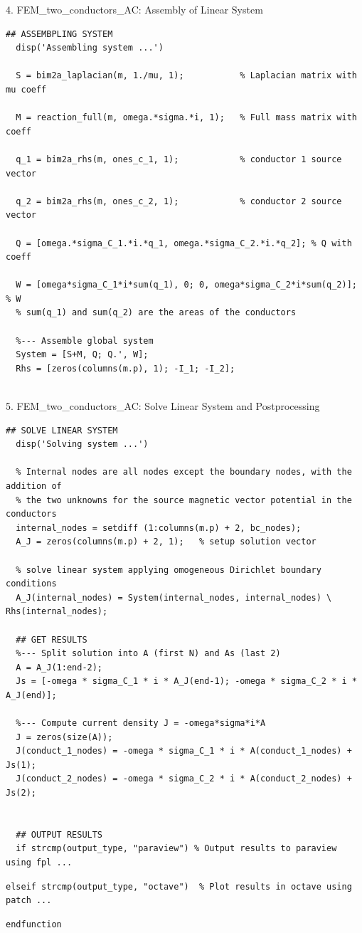 \documentclass[aspectratio=54,xcolor=dvipsnames]{beamer}
\begin{document}
\begin{frame}[fragile]{4. FEM\_two\_conductors\_AC: Assembly of Linear System}
\scriptsize
\begin{lstlisting}[firstnumber=76]
  ## ASSEMBPLING SYSTEM
  disp('Assembling system ...')

  S = bim2a_laplacian(m, 1./mu, 1);           % Laplacian matrix with mu coeff

  M = reaction_full(m, omega.*sigma.*i, 1);   % Full mass matrix with coeff

  q_1 = bim2a_rhs(m, ones_c_1, 1);            % conductor 1 source vector

  q_2 = bim2a_rhs(m, ones_c_2, 1);            % conductor 2 source vector

  Q = [omega.*sigma_C_1.*i.*q_1, omega.*sigma_C_2.*i.*q_2]; % Q with coeff

  W = [omega*sigma_C_1*i*sum(q_1), 0; 0, omega*sigma_C_2*i*sum(q_2)]; % W
  % sum(q_1) and sum(q_2) are the areas of the conductors

  %--- Assemble global system
  System = [S+M, Q; Q.', W];
  Rhs = [zeros(columns(m.p), 1); -I_1; -I_2];
  
\end{lstlisting}
\end{frame}

\begin{frame}[fragile]{5. FEM\_two\_conductors\_AC: Solve Linear System and Postprocessing}
\scriptsize
\begin{lstlisting}[firstnumber=97]
  ## SOLVE LINEAR SYSTEM
  disp('Solving system ...')

  % Internal nodes are all nodes except the boundary nodes, with the addition of
  % the two unknowns for the source magnetic vector potential in the conductors
  internal_nodes = setdiff (1:columns(m.p) + 2, bc_nodes);
  A_J = zeros(columns(m.p) + 2, 1);   % setup solution vector

  % solve linear system applying omogeneous Dirichlet boundary conditions
  A_J(internal_nodes) = System(internal_nodes, internal_nodes) \ Rhs(internal_nodes);

  ## GET RESULTS
  %--- Split solution into A (first N) and As (last 2)
  A = A_J(1:end-2);
  Js = [-omega * sigma_C_1 * i * A_J(end-1); -omega * sigma_C_2 * i * A_J(end)];

  %--- Compute current density J = -omega*sigma*i*A
  J = zeros(size(A));
  J(conduct_1_nodes) = -omega * sigma_C_1 * i * A(conduct_1_nodes) + Js(1);
  J(conduct_2_nodes) = -omega * sigma_C_2 * i * A(conduct_2_nodes) + Js(2);
  

  ## OUTPUT RESULTS
  if strcmp(output_type, "paraview") % Output results to paraview using fpl ...

\end{lstlisting}
\begin{lstlisting}[firstnumber=141]
  elseif strcmp(output_type, "octave")  % Plot results in octave using patch ...
\end{lstlisting}
\begin{lstlisting}[firstnumber=168]
endfunction
\end{lstlisting}
\end{frame}
\end{document}
